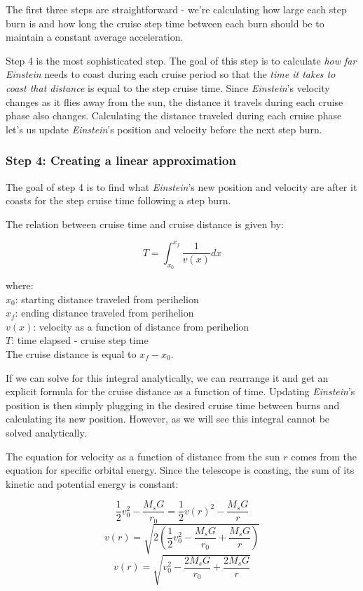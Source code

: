 \documentclass[12pt]{article} %
\begin{document}
The first three steps are straightforward - we're calculating how large each step burn is and how long the cruise step time between each burn should be to maintain a constant average acceleration.

Step 4 is the most sophisticated step. The goal of this step is to calculate \textit{how far} \textit{Einstein} needs to coast during each cruise period so that the \textit{time it takes to coast that distance} is equal to the step cruise time. Since \textit{Einstein}'s velocity changes as it flies away from the sun, the distance it travels during each cruise phase also changes. Calculating the distance traveled during each cruise phase let's us update \textit{Einstein}'s position and velocity before the next step burn.

\subsubsection{Step 4: Creating a linear approximation}
The goal of step 4 is to find what \textit{Einstein}'s new position and velocity are after it coasts for the step cruise time following a step burn.

The relation between cruise time and cruise distance is given by: 

$$T = \int_{x_0}^{x_f} \frac{1}{v(x)} dx$$

where:\\
$x_0$: starting distance traveled from perihelion\\
$x_f$: ending distance traveled from perihelion\\
$v(x)$: velocity as a function of distance from perihelion\\
$T$: time elapsed - cruise step time\\

The cruise distance is equal to $x_f - x_0$.

If we can solve for this integral analytically, we can rearrange it and get an explicit formula for the cruise distance as a function of time. Updating \textit{Einstein}'s position is then simply plugging in the desired cruise time between burns and calculating its new position. However, as we will see this integral cannot be solved analytically.

The equation for velocity as a function of distance from the sun $r$ comes from the equation for specific orbital energy. Since the telescope is coasting, the sum of its kinetic and potential energy is constant:

$$\frac{1}{2}v_0^2-\frac{M_sG}{r_0} = \frac{1}{2}v(r)^2-\frac{M_sG}{r}$$
$$v(r) = \sqrt{2  (\frac{1}{2}v_0^2-\frac{M_sG}{r_0} + \frac{M_sG}{r})}$$
$$v(r) = \sqrt{v_0^2-\frac{2M_sG}{r_0} + \frac{2M_sG}{r}}$$
\end{document}
